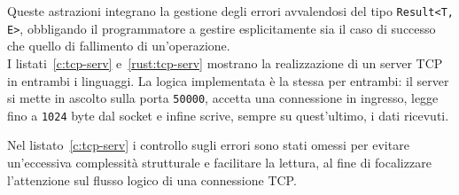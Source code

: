 Queste astrazioni integrano la gestione degli errori avvalendosi del tipo \texttt{Result<T, E>}, obbligando
il programmatore a gestire esplicitamente sia il caso di successo che quello di fallimento di un'operazione. \hfill
\vspace{8pt} \\
\noindent I listati~\ref{c:tcp-serv} e~\ref{rust:tcp-serv} mostrano la realizzazione di un server TCP in entrambi i linguaggi. 
La logica implementata è la stessa per entrambi: il server si mette in ascolto sulla porta \texttt{50000}, accetta una connessione in ingresso, legge fino a \texttt{1024} byte dal socket 
e infine scrive, sempre su quest'ultimo, i dati ricevuti.

Nel listato~\ref{c:tcp-serv} i controllo sugli errori sono stati omessi per evitare un'eccessiva complessità strutturale e facilitare la lettura, al fine di focalizzare l'attenzione sul
flusso logico di una connessione TCP.\ 

